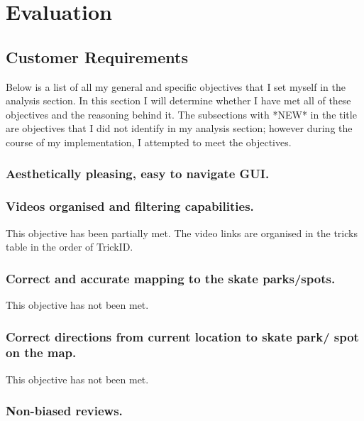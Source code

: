 \chapter{Evaluation}

\section{Customer Requirements}

Below is a list of all my general and specific objectives that I set myself in the analysis section. In this section I will determine whether I have met all of these objectives and the reasoning behind it. The subsections with *NEW* in the title are objectives that I did not identify in my analysis section; however during the course of my implementation, I attempted to meet the objectives. 

\subsection{Aesthetically pleasing, easy to navigate GUI.} %




\subsection{Videos organised and filtering capabilities.}

This objective has been partially met. The video links are organised in the tricks table in the order of TrickID.



\subsection{Correct and accurate mapping to the skate parks/spots.}

This objective has not been met.



\subsection {Correct directions from current location to skate park/ spot on the map.}

This objective has not been met.



\subsection{Non-biased reviews.}

